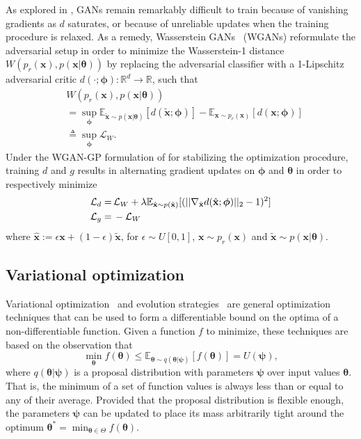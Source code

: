 \documentclass{article}
\newcommand{\bftheta}{{\bm \theta}}
\newcommand{\bfpsi}{{\bm \psi}}
\newcommand{\bfphi}{{\bm \phi}}
\theoremstyle{plain}
\begin{document}
As explored in \cite{2017arXiv170104862A}, GANs remain remarkably
difficult to train because of vanishing gradients as $d$ saturates, or because of
unreliable updates when the training procedure is relaxed. As a remedy,
Wasserstein GANs~\cite{2017arXiv170107875A} (WGANs) reformulate the adversarial
setup in order to minimize the Wasserstein-1 distance $W( p_r(\mathbf{x} ), p(\mathbf{x} | \bftheta)  )$
by replacing the adversarial classifier with a 1-Lipschitz adversarial critic
$d(\cdot; \bfphi) : \mathbb{R}^d \to \mathbb{R}$, such that
\begin{align}
& W( p_r(\mathbf{x} ), p(\mathbf{x} | \bftheta)  ) \nonumber \\
&= \sup_{\bfphi}  \mathbb{E}_{\tilde{\mathbf{x}}\sim p(\mathbf{x}|\bftheta)} [d(\tilde{\mathbf{x}}; \bfphi)] - \mathbb{E}_{\mathbf{x} \sim p_r(\mathbf{x})} [d(\mathbf{x}; \bfphi)] \nonumber \\
&\triangleq \sup_{\bfphi} \mathcal{L}_W.
\end{align}
Under the WGAN-GP formulation of \cite{2017arXiv170400028G}
for stabilizing the optimization procedure,
training $d$ and $g$ results in alternating gradient updates on $\bfphi$ and $\bftheta$ in order to respectively minimize
\begin{align}
    {\cal L}_d =\,&  \mathcal{L}_W + \lambda \mathbb{E}_{\hat{\mathbf{x}} \sim p({\hat{\mathbf{x}})}} [(|| \nabla_{\hat{\mathbf{x}}} d({\hat{\mathbf{x}}};\bfphi) ||_2 - 1)^2] \\
    {\cal L}_g =\,& - \mathcal{L}_W
\end{align}
where ${\hat{\mathbf{x}}} := \epsilon \mathbf{x} +
(1-\epsilon)\tilde{\mathbf{x}}$, for $\epsilon \sim U[0,1]$, $\mathbf{x} \sim
p_r(\mathbf{x})$ and $\tilde{\mathbf{x}} \sim p(\mathbf{x}|\bftheta)$.


\subsection{Variational optimization}

Variational optimization~\cite{2012arXiv1212.4507S,staines2013optimization} and evolution strategies~\cite{2011arXiv1106.4487W} are general
optimization techniques that can be used to form a differentiable bound
on the optima of a non-differentiable function. Given a function $f$ to minimize,
these techniques are based on the observation that
\begin{equation}
    \min_{\bftheta} f(\bftheta) \leq \mathbb{E}_{\bftheta \sim q(\bftheta|\bfpsi)} [f(\bftheta)] = U(\bfpsi),
\end{equation}
where $q(\bftheta|\bfpsi)$ is a proposal distribution with parameters $\bfpsi$ over input values $\bftheta$.
That is, the minimum of a set of function values is always less than or equal
to any of their average. Provided that the proposal distribution is flexible enough, the parameters $\bfpsi$
can be updated to place its mass arbitrarily tight around the optimum $\bftheta^* = \min_{\bftheta \in \Theta} f(\bftheta)$.
\end{document}
